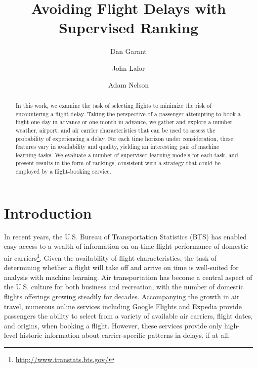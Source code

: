 \documentclass{article}
\title{Avoiding Flight Delays with Supervised Ranking}
\author{Dan Garant \and John Lalor \and Adam Nelson}
\date{}
\begin{document}
\maketitle

\begin{abstract}
In this work, we examine the task of selecting flights to minimize the risk of encountering a flight delay.
Taking the perspective of a passenger attempting to book a flight one day in advance or one month in advance, we gather and explore a number weather, airport, and air carrier characteristics that can be used to assess the probability of experiencing a delay. For each time horizon under consideration, these features vary in availability and quality, yielding an interesting pair of machine learning tasks. We evaluate a number of supervised learning models for each task, and present results in the form of rankings, consistent with a strategy that could be employed by a flight-booking service.
\end{abstract}

\section{Introduction}

In recent years, the U.S. Bureau of Transportation Statistics (BTS)  has enabled easy access to a wealth of information on on-time flight performance of domestic air carriers\footnote{\url{http://www.transtats.bts.gov/}}.
Given the availability of flight characteristics, the task of determining whether a flight will take off and arrive on time is well-suited for analysis with machine learning.
Air transportation has become a central aspect of the U.S. culture for both business and recreation, with the number of domestic flights offerings growing steadily for decades.
Accompanying the growth in air travel, numerous online services including Google Flights and Expedia provide passengers the ability to select from a variety of available air carriers, flight dates, and origins, when booking a flight.
However, these services provide only high-level historic information about carrier-specific patterns in delays, if at all.
\end{document}
